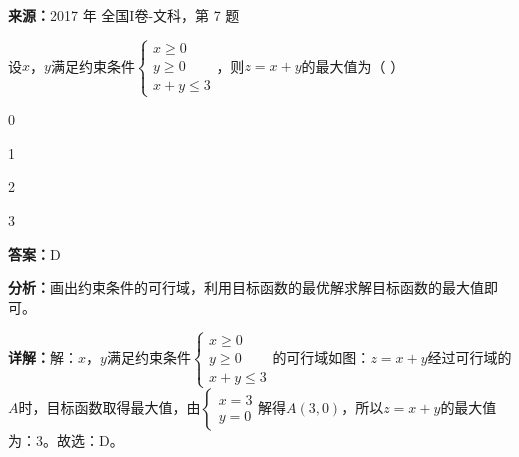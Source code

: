 \begin{question}[points=5]
\textbf{来源：}2017 年 全国I卷-文科，第 7 题\par
设$x$，$y$满足约束条件$\begin{cases} x\ge 0 \\ y\ge 0 \\ x+y\le 3 \end{cases}$，则$z=x+y$的最大值为（   ）
\begin{choices}
  \item 0
  \item 1
  \item 2
  \item 3
\end{choices}
\begin{solution}
\textbf{答案：}D

\textbf{分析：}画出约束条件的可行域，利用目标函数的最优解求解目标函数的最大值即可。

\textbf{详解：}解：$x$，$y$满足约束条件$\begin{cases} x\ge 0 \\ y\ge 0 \\ x+y\le 3 \end{cases}$的可行域如图：$z=x+y$经过可行域的$A$时，目标函数取得最大值，由$\begin{cases} x=3 \\ y=0 \end{cases}$解得$A(3,0)$，所以$z=x+y$的最大值为：3。故选：D。
\end{solution}
\end{question}

